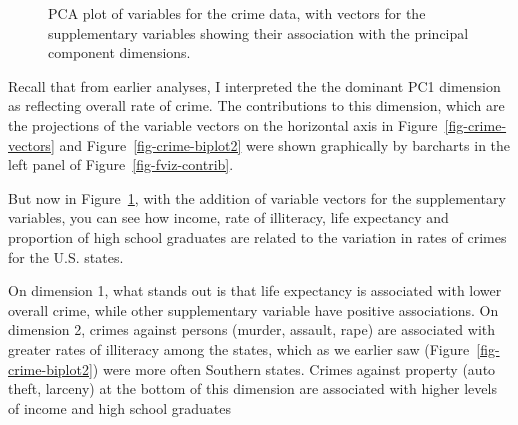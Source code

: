 \documentclass[
  letterpaper,
  10pt,
  krantz2]{krantz}
\begin{document}
{\begin{figure}[H]


\caption{\label{fig-crime-factominer}PCA plot of variables for the crime
data, with vectors for the supplementary variables showing their
association with the principal component dimensions.}

\end{figure}%

Recall that from earlier analyses, I interpreted the the dominant PC1
dimension as reflecting overall rate of crime. The contributions to this
dimension, which are the projections of the variable vectors on the
horizontal axis in Figure~\ref{fig-crime-vectors} and
Figure~\ref{fig-crime-biplot2} were shown graphically by barcharts in
the left panel of Figure~\ref{fig-fviz-contrib}.

But now in Figure~\ref{fig-crime-factominer}, with the addition of
variable vectors for the supplementary variables, you can see how
income, rate of illiteracy, life expectancy and proportion of high
school graduates are related to the variation in rates of crimes for the
U.S. states.

On dimension 1, what stands out is that life expectancy is associated
with lower overall crime, while other supplementary variable have
positive associations. On dimension 2, crimes against persons (murder,
assault, rape) are associated with greater rates of illiteracy among the
states, which as we earlier saw (Figure~\ref{fig-crime-biplot2}) were
more often Southern states. Crimes against property (auto theft,
larceny) at the bottom of this dimension are associated with higher
levels of income and high school graduates

}
\end{document}
